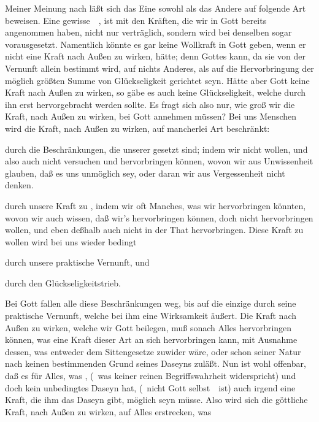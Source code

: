 \begin{aufza}
\item Meiner Meinung nach läßt sich das Eine sowohl als das Andere auf folgende Art beweisen. Eine gewisse~\ , ist mit den  Kräften, die wir in Gott bereits angenommen haben, nicht nur verträglich, sondern wird bei denselben sogar vorausgesetzt. Namentlich könnte es gar keine Wollkraft in Gott geben, wenn er nicht eine Kraft nach Außen zu wirken, hätte; denn Gottes  kann, da sie von der Vernunft allein bestimmt wird, auf nichts Anderes, als auf die Hervorbringung der möglich größten Summe von Glückseligkeit gerichtet seyn. Hätte aber Gott keine Kraft nach Außen zu wirken, so gäbe es auch keine Glückseligkeit, welche durch ihn erst hervorgebracht werden sollte. Es fragt sich also nur, wie groß wir die Kraft, nach Außen zu wirken, bei Gott annehmen müssen? Bei uns Menschen wird die Kraft, nach Außen zu wirken, auf mancherlei Art beschränkt:
\begin{aufzb}
\item durch die Beschränkungen, die unserer  gesetzt sind; indem wir nicht wollen, und also auch nicht versuchen und hervorbringen können, wovon wir aus Unwissenheit glauben, daß es uns unmöglich sey, oder daran wir aus Vergessenheit nicht denken.
\item durch unsere Kraft zu , indem wir oft Manches, was wir hervorbringen könnten, wovon wir auch wissen, daß wir's hervorbringen können, doch nicht hervorbringen wollen, und eben deßhalb auch nicht in der That hervorbringen. Diese Kraft zu wollen wird bei uns wieder bedingt
\begin{inparaenum}[(g)]
\item durch unsere praktische Vernunft, und
\item durch den Glückseligkeitstrieb.
\end{inparaenum}
\end{aufzb}
Bei Gott fallen alle diese Beschränkungen weg, bis auf die einzige durch seine praktische Vernunft, welche bei ihm eine  Wirksamkeit äußert. Die Kraft nach Außen zu wirken, welche wir Gott beilegen, muß sonach Alles hervorbringen können, was eine Kraft dieser Art an sich hervorbringen kann, mit Ausnahme dessen, was entweder dem Sittengesetze zuwider wäre, oder schon seiner Natur nach keinen bestimmenden Grund seines Daseyns zuläßt. Nun ist wohl offenbar, daß es für Alles, was , (\dh\ was keiner reinen Begriffswahrheit widerspricht) und doch kein unbedingtes Daseyn hat, (\dh\ nicht Gott selbst~\ ist) auch irgend eine Kraft, die ihm das Daseyn gibt, möglich seyn müsse. Also wird sich die göttliche Kraft, nach Außen zu wirken, auf Alles erstrecken, was

\end{aufza}
